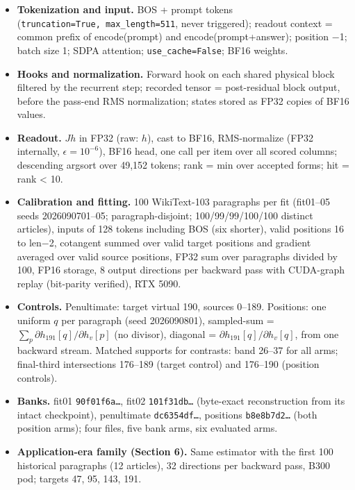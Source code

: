 \documentclass[
  british,
  11pt,
  a4paper,
]{article}
\providecommand{\tightlist}{%
  \setlength{\itemsep}{0pt}\setlength{\parskip}{0pt}}
\begin{document}
\begin{itemize}
\tightlist
\item
  \textbf{Tokenization and input.} BOS + prompt tokens
  (\texttt{truncation=True,\ max\_length=511}, never triggered); readout
  context = common prefix of encode(prompt) and encode(prompt+answer);
  position −1; batch size 1; SDPA attention; \texttt{use\_cache=False};
  BF16 weights.
\item
  \textbf{Hooks and normalization.} Forward hook on each shared physical
  block filtered by the recurrent step; recorded tensor = post-residual
  block output, before the pass-end RMS normalization; states stored as
  FP32 copies of BF16 values.
\item
  \textbf{Readout.} \(J h\) in FP32 (raw: \(h\)), cast to BF16,
  RMS-normalize (FP32 internally, \(\epsilon=10^{-6}\)), BF16 head, one
  call per item over all scored columns; descending argsort over 49,152
  tokens; rank = min over accepted forms; hit = rank \textless{} 10.
\item
  \textbf{Calibration and fitting.} 100 WikiText-103 paragraphs per fit
  (fit01--05 seeds 2026090701--05; paragraph-disjoint; 100/99/99/100/100
  distinct articles), inputs of 128 tokens including BOS (six shorter),
  valid positions 16 to len−2, cotangent summed over valid target
  positions and gradient averaged over valid source positions, FP32 sum
  over paragraphs divided by 100, FP16 storage, 8 output directions per
  backward pass with CUDA-graph replay (bit-parity verified), RTX 5090.
\item
  \textbf{Controls.} Penultimate: target virtual 190, sources 0--189.
  Positions: one uniform \(q\) per paragraph (seed 2026090801),
  sampled-sum = \(\sum_p \partial h_{191}[q]/\partial h_v[p]\) (no
  divisor), diagonal = \(\partial h_{191}[q]/\partial h_v[q]\), from one
  backward stream. Matched supports for contrasts: band 26--37 for all
  arms; final-third intersections 176--189 (target control) and 176--190
  (position controls).
\item
  \textbf{Banks.} fit01 \texttt{90f01f6a…}, fit02 \texttt{101f31db…}
  (byte-exact reconstruction from its intact checkpoint), penultimate
  \texttt{dc6354df…}, positions \texttt{b8e8b7d2…} (both position arms);
  four files, five bank arms, six evaluated arms.
\item
  \textbf{Application-era family (Section 6).} Same estimator with the
  first 100 historical paragraphs (12 articles), 32 directions per
  backward pass, B300 pod; targets 47, 95, 143, 191.
\end{itemize}
\end{document}
